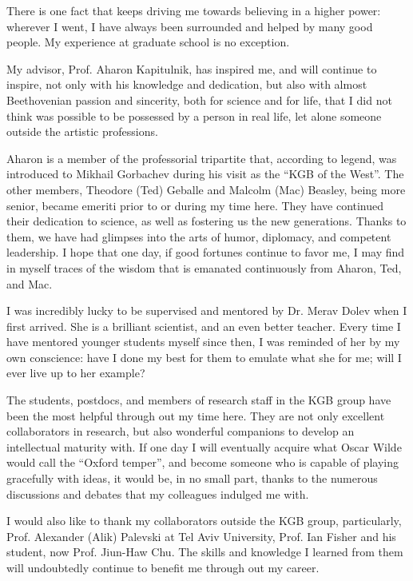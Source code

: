 There is one fact that keeps driving me towards believing in a higher power: wherever I went, I have always been surrounded and helped by many good people. My experience at graduate school is no exception.

My advisor, Prof. Aharon Kapitulnik, has inspired me, and will continue to inspire, not only with his knowledge and dedication, but also with almost Beethovenian passion and sincerity, both for science and for life, that I did not think was possible to be possessed by a person in real life, let alone someone outside the artistic professions.

Aharon is a member of the professorial tripartite that, according to legend, was introduced to Mikhail Gorbachev during his visit as the ``KGB of the West''. The other members, Theodore (Ted) Geballe and Malcolm (Mac) Beasley, being more senior, became emeriti prior to or during my time here. They have continued their dedication to science, as well as fostering us the new generations. Thanks to them, we have had glimpses into the arts of humor, diplomacy, and competent leadership. I hope that one day, if good fortunes continue to favor me, I may find in myself traces of the wisdom that is emanated continuously from Aharon, Ted, and Mac.

I was incredibly lucky to be supervised and mentored by Dr. Merav Dolev when I first arrived. She is a brilliant scientist, and an even better teacher. Every time I have mentored younger students myself since then, I was reminded of her by my own conscience: have I done my best for them to emulate what she for me; will I ever live up to her example?

The students, postdocs, and members of research staff in the KGB group have been the most helpful through out my time here. They are not only excellent collaborators in research, but also wonderful companions to develop an intellectual maturity with. If one day I will eventually acquire what Oscar Wilde would call the ``Oxford temper'', and become someone who is capable of playing gracefully with ideas, it would be, in no small part, thanks to the numerous discussions and debates that my colleagues indulged me with.

I would also like to thank my collaborators outside the KGB group, particularly, Prof. Alexander (Alik) Palevski at Tel Aviv University, Prof. Ian Fisher and his student, now Prof. Jiun-Haw Chu. The skills and knowledge I learned from them will undoubtedly continue to benefit me through out my career. 

